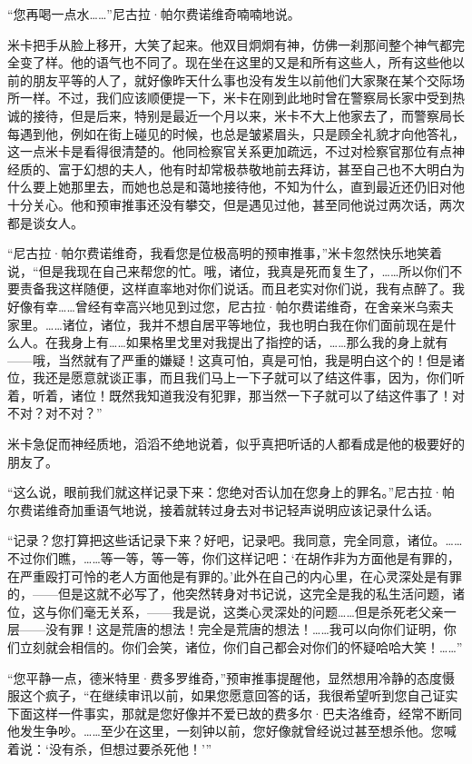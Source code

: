 \par “您再喝一点水……”尼古拉·帕尔费诺维奇喃喃地说。
\par 米卡把手从脸上移开，大笑了起来。他双目炯炯有神，仿佛一刹那间整个神气都完全变了样。他的语气也不同了。现在坐在这里的又是和所有这些人，所有这些他以前的朋友平等的人了，就好像昨天什么事也没有发生以前他们大家聚在某个交际场所一样。不过，我们应该顺便提一下，米卡在刚到此地时曾在警察局长家中受到热诚的接待，但是后来，特别是最近一个月以来，米卡不大上他家去了，而警察局长每遇到他，例如在街上碰见的时候，也总是皱紧眉头，只是顾全礼貌才向他答礼，这一点米卡是看得很清楚的。他同检察官关系更加疏远，不过对检察官那位有点神经质的、富于幻想的夫人，他有时却常极恭敬地前去拜访，甚至自己也不大明白为什么要上她那里去，而她也总是和蔼地接待他，不知为什么，直到最近还仍旧对他十分关心。他和预审推事还没有攀交，但是遇见过他，甚至同他说过两次话，两次都是谈女人。
\par “尼古拉·帕尔费诺维奇，我看您是位极高明的预审推事，”米卡忽然快乐地笑着说，“但是我现在自己来帮您的忙。哦，诸位，我真是死而复生了，……所以你们不要责备我这样随便，这样直率地对你们说话。而且老实对你们说，我有点醉了。我好像有幸……曾经有幸高兴地见到过您，尼古拉·帕尔费诺维奇，在舍亲米乌索夫家里。……诸位，诸位，我并不想自居平等地位，我也明白我在你们面前现在是什么人。在我身上有……如果格里戈里对我提出了指控的话，……那么我的身上就有——哦，当然就有了严重的嫌疑！这真可怕，真是可怕，我是明白这个的！但是诸位，我还是愿意就谈正事，而且我们马上一下子就可以了结这件事，因为，你们听着，听着，诸位！既然我知道我没有犯罪，那当然一下子就可以了结这件事了！对不对？对不对？”
\par 米卡急促而神经质地，滔滔不绝地说着，似乎真把听话的人都看成是他的极要好的朋友了。
\par “这么说，眼前我们就这样记录下来：您绝对否认加在您身上的罪名。”尼古拉·帕尔费诺维奇加重语气地说，接着就转过身去对书记轻声说明应该记录什么话。
\par “记录？您打算把这些话记录下来？好吧，记录吧。我同意，完全同意，诸位。……不过你们瞧，……等一等，等一等，你们这样记吧：‘在胡作非为方面他是有罪的，在严重殴打可怜的老人方面他是有罪的。’此外在自己的内心里，在心灵深处是有罪的，——但是这就不必写了，他突然转身对书记说，这完全是我的私生活问题，诸位，这与你们毫无关系，——我是说，这类心灵深处的问题……但是杀死老父亲一层——没有罪！这是荒唐的想法！完全是荒唐的想法！……我可以向你们证明，你们立刻就会相信的。你们会笑，诸位，你们自己都会对你们的怀疑哈哈大笑！……”
\par “您平静一点，德米特里·费多罗维奇，”预审推事提醒他，显然想用冷静的态度慑服这个疯子，“在继续审讯以前，如果您愿意回答的话，我很希望听到您自己证实下面这样一件事实，那就是您好像并不爱已故的费多尔·巴夫洛维奇，经常不断同他发生争吵。……至少在这里，一刻钟以前，您好像就曾经说过甚至想杀他。您喊着说：‘没有杀，但想过要杀死他！’”

